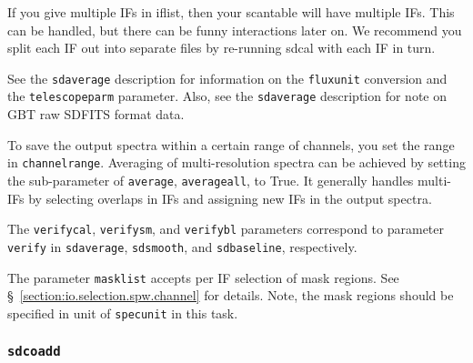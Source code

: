 If you give multiple IFs in iflist, then your scantable will have
multiple IFs. This can be handled, but there can be funny interactions
later on.  We recommend you split each IF out into separate files
by re-running sdcal with each IF in turn.

See the {\tt sdaverage} description for information on the {\tt fluxunit} 
conversion and the {\tt telescopeparm} parameter.
Also, see the {\tt sdaverage} description for note on GBT raw SDFITS format data.

To save the output spectra within a certain range of 
channels, you set the range in {\tt channelrange}. 
Averaging of multi-resolution
spectra can be achieved by setting the sub-parameter of {\tt average}, {\tt averageall}, 
to True. It generally handles multi-IFs by selecting overlaps in IFs and assigning
new IFs in the output spectra. 

The {\tt verifycal}, {\tt verifysm}, and {\tt verifybl}  parameters correspond to parameter
{\tt  verify} in {\tt sdaverage}, {\tt sdsmooth}, and {\tt sdbaseline}, respectively. 
    

The parameter {\tt masklist} accepts per IF selection of mask regions. 
See \S~\ref{section:io.selection.spw.channel} for details. 
Note, the mask regions should be specified in unit of {\tt specunit} 
in this task.


\subsubsection{{\tt sdcoadd}}
\label{section:sd.sdtasks.tasks.sdcoadd}

